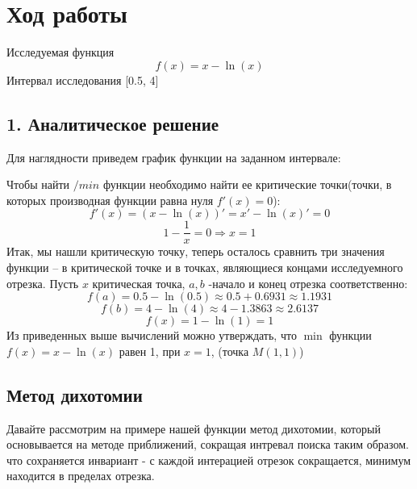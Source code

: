 \documentclass[a4paper, 14pt]{article}
\begin{document}
	\section*{Ход работы}
	Исследуемая функция \[f(x) = x -   \ln(x)\] Интервал исследования [0.5, 4]
	\subsection*{1. Аналитическое решение}
	Для наглядности приведем график функции на заданном интервале:


	Чтобы найти $/min$ функции необходимо найти ее критические точки(точки, в которых производная функции равна нуля $f'(x) = 0$):
	\[f'(x) = (x - \ln(x))' = x' - \ln(x)' = 0\]
	\[1 - \frac{1}{x} = 0 \Rightarrow x = 1\]
	Итак, мы нашли критическую точку, теперь осталось сравнить три значения функции -- в критической точке и в точках, являющиеся концами исследуемного отрезка. Пусть $x$ критическая точка, $a, b$ -начало и конец отрезка соответственно:
	\[f(a) = 0.5 - \ln(0.5) \approx 0.5 + 0.6931  \approx 1.1931\]
	\[f(b) = 4 - \ln(4) \approx 4 - 1.3863 \approx 2.6137\]
	\[f(x) = 1 - \ln(1) = 1\]
	Из приведенных выше вычислений можно утверждать, что $\min$ функции $f(x) = x - \ln(x)$ равен 1, при $x =1$, (точка $M(1,1)$)
	\subsection*{Метод дихотомии}
	Давайте рассмотрим на примере нашей функции метод дихотомии, который основывается на методе приближений, сокращая интревал поиска таким образом. что сохраняется инвариант - с каждой интерацией отрезок сокращается, минимум находится в пределах отрезка.
\end{document}
